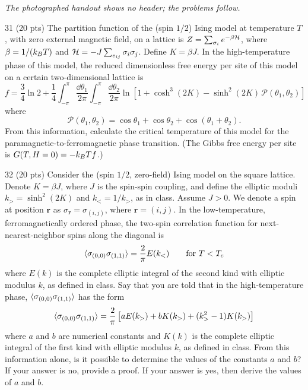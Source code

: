 
\noindent\emph{The photographed handout shows no header; the problems follow.}

\begin{hwproblem}{3}{1}
(20 pts) The partition function of the (spin $1/2$) Ising model at temperature $T$, with zero external magnetic field,
on a lattice is $Z = \sum_{\sigma_i}e^{-\beta\mathcal{H}}$, where $\beta = 1/(k_{B} T)$ and $\mathcal{H} = -J\sum_{e_{ij}}\sigma_i\sigma_j$.
Define $K = \beta J$. In the high-temperature phase of this model, the reduced dimensionless free energy per site of
this model on a certain two-dimensional lattice is
\begin{equation}
  f = \frac{3}{4}\ln 2 + \frac{1}{4}\int_{-\pi}^{\pi}\frac{\dd\theta_1}{2\pi}\int_{-\pi}^{\pi}\frac{\dd\theta_2}{2\pi}
  \ln\left[1+\cosh^3(2K)-\sinh^2(2K)\,\mathcal P(\theta_1,\theta_2)\right]
\end{equation}
where
\begin{equation}
  \mathcal P(\theta_1,\theta_2) = \cos\theta_1+\cos\theta_2+\cos(\theta_1+\theta_2).
\end{equation}
From this information, calculate the critical temperature of this model for the paramagnetic-to-ferromagnetic phase
transition. (The Gibbs free energy per site is $G(T,H=0) = -k_{B} Tf$.)
\end{hwproblem}

\begin{hwproblem}{3}{2}
(20 pts) Consider the (spin $1/2$, zero-field) Ising model on the square lattice. Denote $K = \beta J$, where $J$ is the
spin-spin coupling, and define the elliptic moduli $k_> = \sinh^2(2K)$ and $k_< = 1/k_>$, as in class. Assume $J>0$. We
denote a spin at position $\mathbf r$ as $\sigma_{\mathbf r} = \sigma_{(i,j)}$, where $\mathbf r = (i,j)$. In the
low-temperature, ferromagnetically ordered phase, the two-spin correlation function for next-nearest-neighbor spins
along the diagonal is
\begin{equation}
  \langle \sigma_{(0,0)}\sigma_{(1,1)}\rangle = \frac{2}{\pi}E(k_<)\qquad\text{for } T<T_c
\end{equation}
where $E(k)$ is the complete elliptic integral of the second kind with elliptic modulus $k$, as defined in class. Say
that you are told that in the high-temperature phase, $\langle \sigma_{(0,0)}\sigma_{(1,1)}\rangle$ has the form
\begin{equation}
  \langle \sigma_{(0,0)}\sigma_{(1,1)}\rangle = \frac{2}{\pi}\left[aE(k_>)+bK(k_>)+(k_>^2-1)K(k_>)\right]
\end{equation}
where $a$ and $b$ are numerical constants and $K(k)$ is the complete elliptic integral of the first kind with elliptic
modulus $k$, as defined in class. From this information alone, is it possible to determine the values of the constants
$a$ and $b$? If your answer is no, provide a proof. If your answer is yes, then derive the values of $a$ and $b$.
\end{hwproblem}

